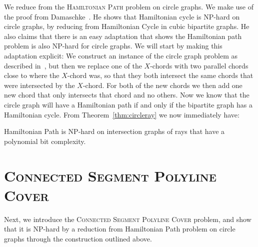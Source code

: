 \documentclass[]{llncs}
\newcommand{\consegcover}{\textsc{Connected Segment Polyline Cover}\xspace}
\begin{document}
We reduce from the \textsc{Hamiltonian Path} problem on circle graphs. We make use of the proof from Damaschke~\cite{DAMASCHKE19891}. He shows that Hamiltonian cycle is NP-hard on circle graphs, by reducing from Hamiltonian Cycle in cubic bipartite graphs. He also claims that there is an easy adaptation that shows the Hamiltonian path problem is also NP-hard for circle graphs. We will start by making this adaptation explicit: We construct an instance of the circle graph problem as described in~\cite{DAMASCHKE19891}, but then we replace one of the $X$-chords with two parallel chords close to where the $X$-chord was, so that they both intersect the same chords that were intersected by the $X$-chord. For both of the new chords we then add one new chord that only intersects that chord and no others. Now we know that the circle graph will have a Hamiltonian path if and only if the bipartite graph has a Hamiltonian cycle. %
%
From Theorem~\ref {thm:circleray} we now immediately have:

%

\begin {corollary} \label {cor:hamraypolyhard}
  Hamiltonian Path is NP-hard on intersection graphs of rays that have a polynomial bit complexity.
\end {corollary}







\section {\consegcover}

Next, we introduce the \textsc{Connected Segment Polyline Cover} problem,
and show that it is NP-hard by a reduction from Hamiltonian Path problem on circle graphs through the construction outlined above.
\end{document}
